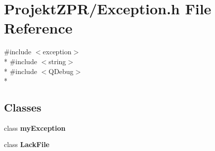 \section{Projekt\-Z\-P\-R/\-Exception.h File Reference}
\label{_exception_8h}
{\ttfamily \#include $<$exception$>$}\\*
{\ttfamily \#include $<$string$>$}\\*
{\ttfamily \#include $<$Q\-Debug$>$}\\*
\subsection*{Classes}
\begin{DoxyCompactItemize}
\item 
class {\bf my\-Exception}
\item 
class {\bf Lack\-File}
\end{DoxyCompactItemize}
